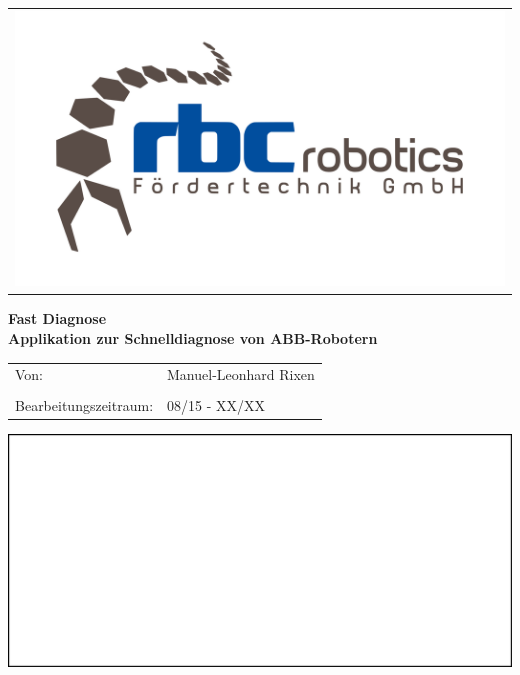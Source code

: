 \begin{titlepage}
\hspace{9cm}
\begin{minipage}{1in}
\begin{tabular}{l}
\includegraphics[width=2\textwidth]{03_Grafiken/logo.png}
\end{tabular}
\end{minipage}
\begin{center}
\vfill
{ \huge \textbf{Fast Diagnose} }\\[0.4cm]
{ \LARGE \textbf{Applikation zur Schnelldiagnose von ABB-Robotern} }\\[0.4cm]
\end{center}
\begin{center}
\vfill
\begin{tabular}{p{5cm}l}
Von: & Manuel-Leonhard Rixen\\
&\\
Bearbeitungszeitraum: & 08/15 - XX/XX
\end{tabular} 

\end{center}
\vfill
\begin{center}
%
%
\includegraphics[width=1.0\textwidth]{03_Grafiken/PseudoImage.jpg}
\vfill
\end{center}
\end{titlepage}